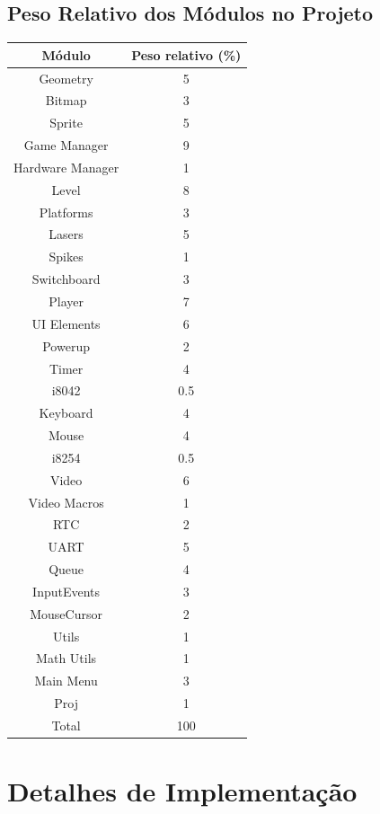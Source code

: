 \documentclass{report}
\begin{document}
\section{Peso Relativo dos Módulos no Projeto}

\begin{center}
	\begin{tabular}{|c|c|} 
		\hline
			Módulo & Peso relativo (\%) \\
		\hline
		\hline
			Geometry & 5 \\
			Bitmap & 3 \\
			Sprite & 5 \\
			Game Manager & 9 \\
			Hardware Manager & 1 \\
			Level & 8 \\
			Platforms & 3 \\
			Lasers & 5 \\
			Spikes & 1 \\
			Switchboard & 3 \\ 
			Player & 7 \\
			UI Elements & 6 \\
			Powerup & 2 \\
			Timer & 4 \\
			i8042 & 0.5 \\
			Keyboard & 4 \\
			Mouse & 4 \\
			i8254 & 0.5 \\
			Video & 6 \\
			Video Macros & 1 \\
			RTC & 2 \\
			UART & 5 \\
			Queue & 4 \\
			InputEvents & 3 \\
			MouseCursor & 2 \\
			Utils & 1 \\
			Math Utils & 1 \\
			Main Menu & 3 \\
			Proj & 1 \\
		\hline
		\hline
			Total & 100 \\
		\hline
	\end{tabular}
\end{center}

\chapter{Detalhes de Implementação}
\end{document}
